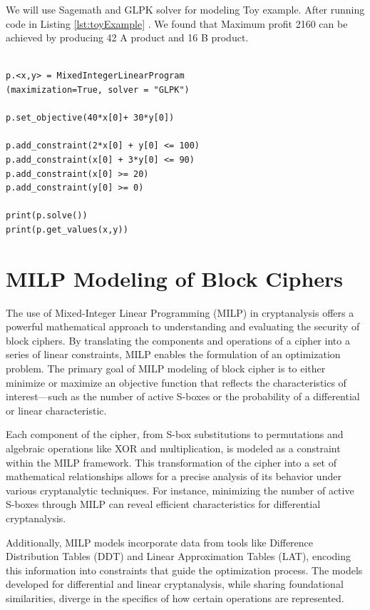 We will use Sagemath and GLPK solver for modeling Toy example. After running code in Listing  \ref{lst:toyExample} . We found that Maximum profit 2160 can be achieved by producing  42 A product and 16 B product.
\begin{lstlisting}[caption={Sagemath MILP modelling of toy example }, label={lst:toyExample}]

p.<x,y> = MixedIntegerLinearProgram 
(maximization=True, solver = "GLPK")

p.set_objective(40*x[0]+ 30*y[0])

p.add_constraint(2*x[0] + y[0] <= 100)
p.add_constraint(x[0] + 3*y[0] <= 90)
p.add_constraint(x[0] >= 20)
p.add_constraint(y[0] >= 0)

print(p.solve())
print(p.get_values(x,y))

\end{lstlisting}
 
\section{MILP Modeling of Block Ciphers}
The use of Mixed-Integer Linear Programming (MILP) in cryptanalysis offers a powerful mathematical approach to understanding and evaluating the security of block ciphers. By translating the components and operations of a cipher into a series of linear constraints, MILP enables the formulation of an optimization problem. The primary goal of MILP modeling of block cipher is to either minimize or maximize an objective function that reflects the characteristics of interest—such as the number of active S-boxes or the probability of a differential or linear characteristic.

Each component of the cipher, from S-box substitutions to permutations and algebraic operations like XOR and multiplication, is  modeled as a constraint within the MILP framework. This transformation of the cipher into a set of mathematical relationships allows for a precise analysis of its behavior under various cryptanalytic techniques. For instance, minimizing the number of active S-boxes through MILP can reveal efficient characteristics for differential cryptanalysis.

Additionally, MILP models incorporate data from tools like Difference Distribution Tables (DDT) and Linear Approximation Tables (LAT), encoding this information into constraints that guide the optimization process. The models developed for differential and linear cryptanalysis, while sharing foundational similarities, diverge in the specifics of how certain operations are represented. 

